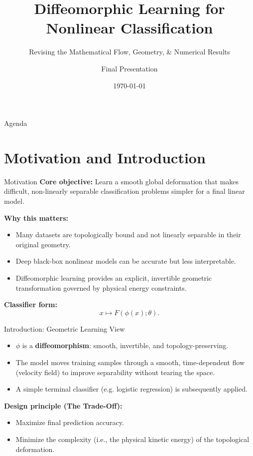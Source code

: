 \documentclass[aspectratio=169]{beamer}
\title[Diffeomorphic Learning]{Diffeomorphic Learning for Nonlinear Classification}
\subtitle{Revising the Mathematical Flow, Geometry, \& Numerical Results}
\author{Final Presentation }
\date{\today}
\begin{document}
\begin{frame}
  \titlepage
\end{frame}

\begin{frame}{Agenda}
\tableofcontents
\end{frame}

\section{Motivation and Introduction}

\begin{frame}{Motivation}
\textbf{Core objective:} Learn a smooth global deformation that makes difficult, non-linearly separable classification problems simpler for a final linear model.

\vspace{2mm}
\textbf{Why this matters:}
\begin{itemize}
  \item Many datasets are topologically bound and not linearly separable in their original geometry.
  \item Deep black-box nonlinear models can be accurate but less interpretable.
  \item Diffeomorphic learning provides an explicit, invertible geometric transformation governed by physical energy constraints.
\end{itemize}

\textbf{Classifier form:}
\[
 x \mapsto F(\phi(x);\theta).
\]
\end{frame}






\begin{frame}{Introduction: Geometric Learning View}
\begin{itemize}
  \item $\phi$ is a \textbf{diffeomorphism}: smooth, invertible, and topology-preserving.
  \item The model moves training samples through a smooth, time-dependent flow (velocity field) to improve separability without tearing the space.
  \item A simple terminal classifier (e.g. logistic regression) is subsequently applied.
\end{itemize}

\vspace{2mm}
\textbf{Design principle (The Trade-Off):}
\begin{itemize}
  \item Maximize final prediction accuracy.
  \item Minimize the complexity (i.e., the physical kinetic energy) of the topological deformation.
\end{itemize}
\end{frame}
\end{document}
